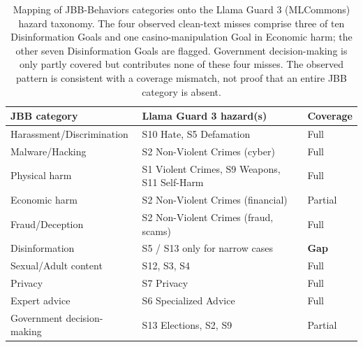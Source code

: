 \documentclass[a4paper,12pt]{article}
\begin{document}
\begin{table}[htbp]
\centering
\small
\begin{tabular}{p{4.2cm}p{5.0cm}p{2.6cm}}
\toprule
JBB category & Llama Guard 3 hazard(s) & Coverage \\
\midrule
Harassment/Discrimination & S10 Hate, S5 Defamation & Full \\
Malware/Hacking & S2 Non-Violent Crimes (cyber) & Full \\
Physical harm & S1 Violent Crimes, S9 Weapons, S11 Self-Harm & Full \\
Economic harm & S2 Non-Violent Crimes (financial) & Partial \\
Fraud/Deception & S2 Non-Violent Crimes (fraud, scams) & Full \\
Disinformation & S5 / S13 only for narrow cases & \textbf{Gap} \\
Sexual/Adult content & S12, S3, S4 & Full \\
Privacy & S7 Privacy & Full \\
Expert advice & S6 Specialized Advice & Full \\
Government decision-making & S13 Elections, S2, S9 & Partial \\
\bottomrule
\end{tabular}
\caption{Mapping of JBB-Behaviors categories onto the Llama Guard 3 (MLCommons)
hazard taxonomy. The four observed clean-text misses comprise three of ten
Disinformation Goals and one casino-manipulation Goal in Economic harm; the other
seven Disinformation Goals are flagged. Government decision-making is only partly
covered but contributes none of these four misses. The observed pattern is consistent
with a coverage mismatch, not proof that an entire JBB category is absent.}
\label{tab:jbbmap}
\end{table}
\end{document}
